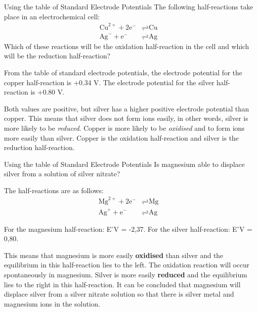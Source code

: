 \begin{wex}{Using the table of Standard Electrode Potentials}
{The following half-reactions take place in an electrochemical cell:
  \begin{align*}
    \text{Cu}^{2+} + 2\text{e}^{-} &\rightleftharpoons \text{Cu} \\
    \text{Ag}^{-} + \text{e}^{-} &\rightleftharpoons \text{Ag}
  \end{align*}
  Which of these reactions will be the oxidation half-reaction in the
  cell and which will be the reduction half-reaction?
}
{
From the table of standard electrode potentials, the electrode potential for the copper half-reaction is +0.34 V. The electrode potential for the silver half-reaction is +0.80 V.

Both values are positive, but silver has a higher positive electrode potential than copper. This means that silver does not form ions easily, in other words, silver is more likely to be \textit{reduced}. Copper is more likely to be \textit{oxidised} and to form ions more easily than silver. Copper is the oxidation half-reaction and silver is the reduction half-reaction.
}
\end{wex}


\begin{wex}{Using the table of Standard Electrode Potentials}
{Is magnesium able to displace silver from a solution of silver nitrate?}
{
The half-reactions are as follows:
\begin{align*}
  \text{Mg}^{2+} + 2\text{e}^{-} &\rightleftharpoons \text{Mg} \\
  \text{Ag}^{+} + \text{e}^{-} &\rightleftharpoons \text{Ag}
\end{align*}

For the magnesium half-reaction: E$^{\circ}$V = -2,37. For the silver half-reaction: E$^{\circ}$V = 0,80.

This means that magnesium is more easily \textbf{oxidised} than silver and the equilibrium in this half-reaction lies to the left. The oxidation reaction will occur spontaneously in magnesium. Silver is more easily \textbf{reduced} and the equilibrium lies to the right in this half-reaction. It can be concluded that magnesium will displace silver from a silver nitrate solution so that there is silver metal and magnesium ions in the solution.
}
\end{wex}

